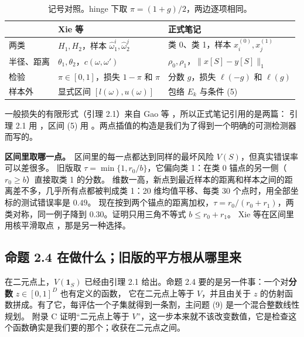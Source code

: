 \documentclass[11pt,a4paper,fontset=none]{ctexart}
\theoremstyle{definition}
\newcommand{\para}[1]{\par\smallskip\noindent\textbf{#1}\ }
\begin{document}
\begin{table}[htbp]
\centering\small
\begin{tabular}{lll}
\toprule
& Xie 等 \cite{xie2021robust} & 正式笔记\\
\midrule
两类 & $H_1,H_2$，样本 $\widehat\omega^i_1,\widehat\omega^j_2$ & 类 0、类 1，样本 $x^{(0)}_i,x^{(1)}_j$\\
半径、距离 & $\theta_1,\theta_2$，$c(\omega,\omega')$ & $\rho_0,\rho_1$，$\|x[S]-y[S]\|_1$\\
检验 & $\pi\in[0,1]$，损失 $1-\pi$ 和 $\pi$ & 分数 $g$，损失 $\ell(-g)$ 和 $\ell(g)$\\
样本外 & 显式区间 $[l(\omega),u(\omega)]$ & 包络 $E_k$ 与条件 (5)\\
\bottomrule
\end{tabular}
\caption{记号对照。hinge 下取 $\pi=(1+g)/2$，两边逐项相同。}
\label{tab:xie}
\end{table}

一般损失的有限形式（引理 2.1）来自 Gao 等 \cite{gao2018robust}，所以正式笔记引用的是两篇：
引理 2.1 用 \cite{gao2018robust}，区间 (5) 用 \cite{xie2021robust}。两点插值的构造是我们为了得到一个明确的可测检测器而写的。

\para{区间里取哪一点。}区间里的每一点都达到同样的最坏风险 $V(S)$，但真实错误率可以差很多。
旧版取 $\tau=\min\{1,r_0/b\}$，它偏向类 1：在类 0 锚点的另一侧（$r_0\ge b$）直接取类 1 的分数。
维数一高，新点到最近样本的距离和样本之间的距离差不多，几乎所有点都被判成类 1：20 维均值平移、每类 30 个点时，用全部坐标的测试错误率是 $0.49$。
现在按到两个锚点的距离加权，$\tau=r_0/(r_0+r_1)$，两类对称，同一例子降到 $0.30$。证明只用三角不等式 $b\le r_0+r_1$。
Xie 等在区间里用核平滑取点 \cite{xie2021robust}，那是另一种选择。

\subsection{命题 2.4 在做什么；旧版的平方根从哪里来}
在二元点上，$V(\mathbf 1_S)$ 已经由引理 2.1 给出。命题 2.4 要的是另一件事：一个对\textbf{分数} $z\in[0,1]^D$ 也有定义的函数，
它在二元点上等于 $V$，并且由关于 $z$ 的仿射函数拼成。有了它，每评估一个子集就得到一条割，主问题 (9) 是一个混合整数线性规划。
附录 C 证明“二元点上等于 $V$”，这一步本来就不该改变数值，它是检查这个函数确实是我们要的那个；收获在二元点之间。
\end{document}
